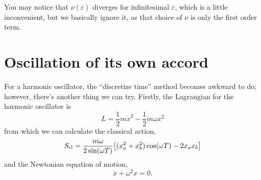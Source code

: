 \documentclass[]{revision-notes}
\begin{document}
You may notice that \( \nu(\varepsilon) \) diverges for infinitesimal \(\varepsilon \), which is a little inconvenient, but we basically ignore it, as that choice of \(\nu\) is only the first order term.

\section{Oscillation of its own accord}
For a harmonic oscillator, the ``discretize time'' method becomes awkward to do; however, there's another thing we can try.
Firstly, the Lagrangian for the harmonic oscillator is
\[ L = \frac{1}{2} m \dot{x}^2 - \frac{1}{2}m \omega x^2\] from which we can calculate the classical action,
\[ S_{\mathrm{cl}} = \frac{m\omega}{2\sin(\omega T)} \qty[(x_a^2 + x_b^2)\cos(\omega T) - 2x_a x_b]\]
and the Newtonian equation of motion, \[ \ddot{x} + \omega^2 x = 0. \]
\end{document}
